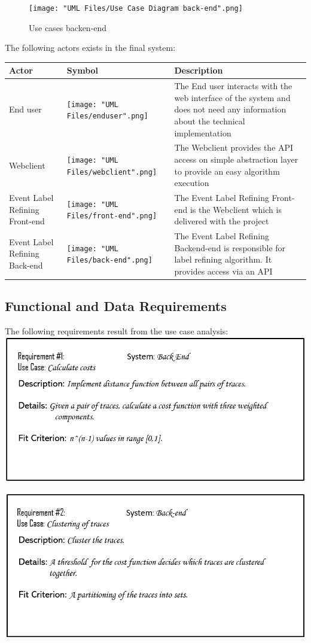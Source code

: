 \documentclass[notitlepage]{article}
\begin{document}
\begin{flushleft}
\begin{figure}[h!]
  \texttt{[image: "UML Files/Use Case Diagram back-end".png]}
  \caption{Use cases backen-end}
  \label{fig:back-end}
\end{figure}
\clearpage
The following actors exists in the final system:\\
\medskip
\begin{tabularx}{\textwidth}{|m{4cm}|m{4cm}|m{8cm}|}
	\hline
	\textbf{Actor} 
	&\textbf{Symbol}
	&\textbf{Description}\\
	\hline
	End user & \texttt{[image: "UML Files/enduser".png]} & The End user interacts with the web interface of the system and does not need any information about the technical implementation\\
	\hline
	Webclient & \texttt{[image: "UML Files/webclient".png]} & The Webclient provides the API access on simple abstraction layer to provide an easy algorithm execution\\
	\hline
	Event Label Refining Front-end & \texttt{[image: "UML Files/front-end".png]} & The Event Label Refining Front-end is the Webclient which is delivered with the project \\
	\hline
	Event Label Refining Back-end & \texttt{[image: "UML Files/back-end".png]} & The Event Label Refining Backend-end is responsible for label refining algorithm. It provides access via an API \\
	\hline
\end{tabularx}

\subsection{Functional and Data Requirements}
The following requirements result from the use case analysis:\\
\medskip
\includegraphics[scale=0.6]{reqq1.png}

\includegraphics[scale=0.6]{reqq2.png}


\end{flushleft}
\end{document}
